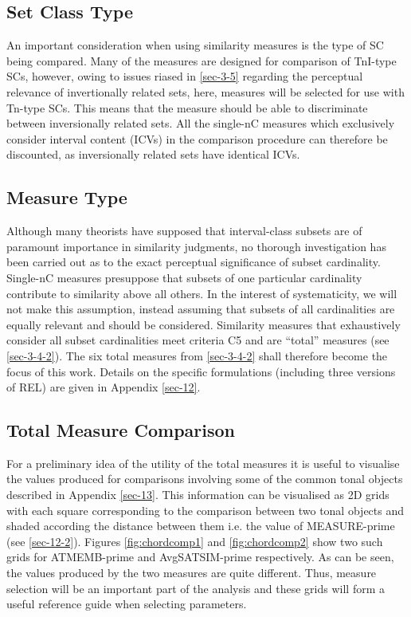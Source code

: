 \documentclass{article}
\begin{document}
\subsection{Set Class Type}
\label{sec-6-3}

An important consideration when using similarity measures is the type
of SC being compared. Many of the measures are designed for comparison
of TnI-type SCs, however, owing to issues riased in \ref{sec-3-5} regarding the perceptual relevance of invertionally related
sets, here, measures will be selected for use with Tn-type SCs. This
means that the measure should be able to discriminate between
inversionally related sets. All the single-nC measures which
exclusively consider interval content (ICVs) in the comparison
procedure can therefore be discounted, as inversionally related sets
have identical ICVs.
\subsection{Measure Type}
\label{sec-6-4}

Although many theorists have supposed that interval-class subsets are
of paramount importance in similarity judgments, no thorough
investigation has been carried out as to the exact perceptual
significance of subset cardinality. Single-nC measures presuppose that
subsets of one particular cardinality contribute to similarity above
all others. In the interest of systematicity, we will not make this
assumption, instead assuming that subsets of all cardinalities are
equally relevant and should be considered. Similarity measures that
exhaustively consider all subset cardinalities meet criteria C5 and
are ``total'' measures (see \ref{sec-3-4-2}). The six total measures
from \ref{sec-3-4-2} shall therefore become the focus of this
work. Details on the specific formulations (including three versions
of REL) are given in Appendix \ref{sec-12}.
\subsection{Total Measure Comparison}
\label{sec-6-5}

For a preliminary idea of the utility of the total measures it is
useful to visualise the values produced for comparisons involving some
of the common tonal objects described in Appendix \ref{sec-13}. This information can be visualised as 2D grids with each
square corresponding to the comparison between two tonal objects and
shaded according the distance between them i.e. the value of
MEASURE-prime (see \ref{sec-12-2}). Figures \ref{fig:chordcomp1} and
\ref{fig:chordcomp2} show two such grids for ATMEMB-prime and
AvgSATSIM-prime respectively. As can be seen, the values produced by
the two measures are quite different. Thus, measure selection will be
an important part of the analysis and these grids will form a useful
reference guide when selecting parameters.
\end{document}
